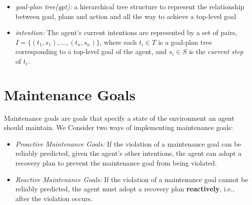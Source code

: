 \documentclass[portrait, plainsections]{sciposter}
\begin{document}
\begin{multicols}{3}
\begin{itemize}
\item \textit{goal-plan tree(gpt):} a hierarchical tree structure to represent the relationship between goal, plans and action and all the way to achieve a top-level goal
\item \textit{intention:} The agent's current intentions are represented by a set of pairs, $I = \{(t_1, s_1), \ldots, (t_n, s_n)\}$, where each $t_i \in T$ is a goal-plan tree corresponding to a top-level goal of the agent, and $s_i \in S$ is the \emph{current step} of $t_i$. 
\end{itemize}


\section*{Maintenance Goals}
Maintenance goals are goals that specify a state of the environment an agent should maintain.
We Consider two ways of implementing maintenance goals: 

\begin{shaded}
\begin{itemize}
\item \textit{Proactive Maintenance Goals:} If the violation of a maintenance goal can be reliably predicted, given the agent's other intentions, the agent can adopt a recovery plan to prevent the maintenance goal from being violated.

\item \textit{Reactive Maintenance Goals:} If the violation of a maintenance goal cannot be reliably predicted, the agent must adopt a recovery plan \textbf{reactively}, i.e., after the violation occurs.
\end{itemize}
\end{shaded}

\begin{figure}[H]
\end{figure}


\end{multicols}
\end{document}
